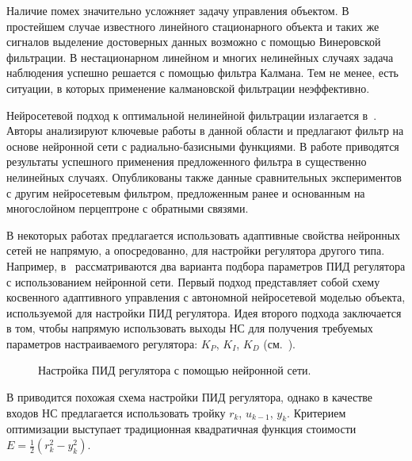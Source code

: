
Наличие помех значительно усложняет задачу управления объектом.  В
простейшем случае известного линейного стационарного объекта и таких
же сигналов выделение достоверных данных возможно с помощью
Винеровской фильтрации.  В нестационарном линейном и многих нелинейных
случаях задача наблюдения успешно решается с помощью фильтра Калмана.
Тем не менее, есть ситуации, в которых применение калмановской
фильтрации неэффективно.

Нейросетевой подход к оптимальной нелинейной фильтрации излагается
в~\cite{hayyeeder97}.  Авторы анализируют ключевые работы в данной
области и предлагают фильтр на основе нейронной сети с
радиально-базисными функциями.  В работе приводятся результаты
успешного применения предложенного фильтра в существенно нелинейных
случаях.  Опубликованы также данные сравнительных экспериментов с
другим нейросетевым фильтром, предложенным ранее и основанным на
многослойном перцептроне с обратными связями.



В некоторых работах предлагается использовать адаптивные свойства
нейронных сетей не напрямую, а опосредованно, для настройки регулятора
другого типа.  Например, в~\cite{samtar96} рассматриваются два
варианта подбора параметров ПИД регулятора с использованием нейронной
сети.  Первый подход представляет собой схему косвенного адаптивного
управления с автономной нейросетевой моделью объекта, используемой для
настройки ПИД регулятора.  Идея второго подхода заключается в том,
чтобы напрямую использовать выходы НС для получения требуемых
параметров настраиваемого регулятора: $K_P$, $K_I$, $K_D$
(см.~).

\begin{figure}[h]
  \centering
  
  \caption{Настройка ПИД регулятора с помощью нейронной сети.}
  \label{fig:nn-tunes-pid}
\end{figure}

В \cite{sigom00} приводится похожая схема настройки ПИД регулятора,
однако в качестве входов НС предлагается использовать тройку $r_k$,
$u_{k-1}$, $y_k$.  Критерием оптимизации выступает традиционная
квадратичная функция стоимости $E=\frac{1}{2}(r_k^2-y_k^2)$.

